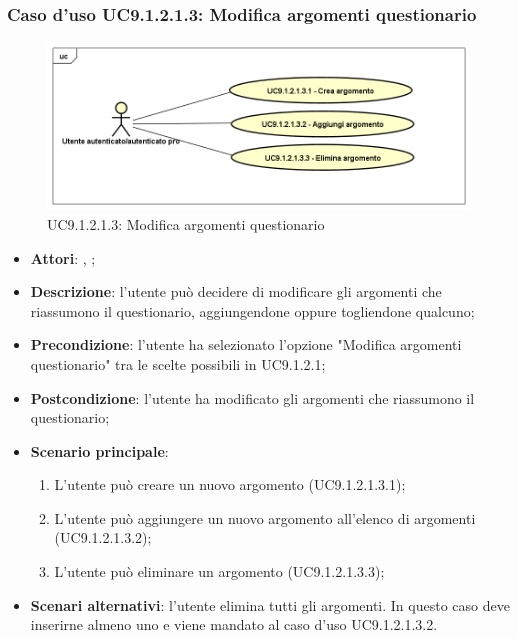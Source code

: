 					\subsubsection{Caso d'uso UC9.1.2.1.3: Modifica argomenti questionario}
					\label{UC9.1.2.1.3}
					\begin{figure}[h]
						\centering
					\includegraphics[scale=0.5,keepaspectratio]{UML/UC9_1_2_1_3.png}
						\caption{UC9.1.2.1.3: Modifica argomenti questionario}
					\end{figure}
					\FloatBarrier
					\begin{itemize}
						\item \textbf{Attori}: \uau, \uaupro;
						\item \textbf{Descrizione}: l'utente può decidere di modificare gli argomenti che riassumono il questionario, aggiungendone oppure togliendone qualcuno; 
						\item \textbf{Precondizione}: l'utente ha selezionato l'opzione "Modifica argomenti questionario" tra le scelte possibili in UC9.1.2.1; 
						\item \textbf{Postcondizione}: l'utente ha modificato gli argomenti che riassumono il questionario; 
						\item \textbf{Scenario principale}:
							\begin{enumerate}
								\item L'utente può creare un nuovo argomento (UC9.1.2.1.3.1);
								\item L'utente può aggiungere un nuovo argomento all'elenco di argomenti (UC9.1.2.1.3.2);
								\item L'utente può eliminare un argomento (UC9.1.2.1.3.3);
							\end{enumerate}
						\item \textbf{Scenari alternativi}: l'utente elimina tutti gli argomenti. In questo caso deve inserirne almeno uno e viene mandato al caso d'uso UC9.1.2.1.3.2.
					\end{itemize}
					
